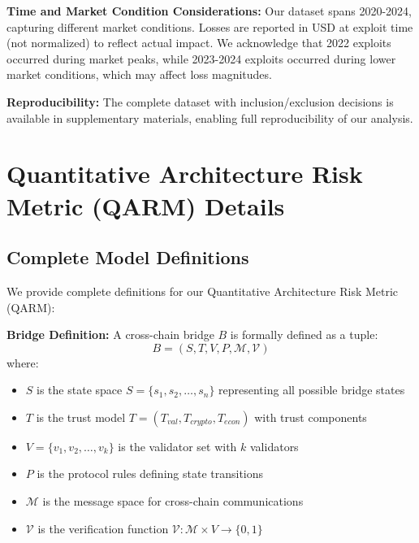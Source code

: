 \documentclass[runningheads]{llncs}
\begin{document}
\textbf{Time and Market Condition Considerations:} Our dataset spans 2020-2024, capturing different market conditions. Losses are reported in USD at exploit time (not normalized) to reflect actual impact. We acknowledge that 2022 exploits occurred during market peaks, while 2023-2024 exploits occurred during lower market conditions, which may affect loss magnitudes.

\textbf{Reproducibility:} The complete dataset with inclusion/exclusion decisions is available in supplementary materials, enabling full reproducibility of our analysis.

\section{Quantitative Architecture Risk Metric (QARM) Details}
\label{app:formal_model}

\subsection{Complete Model Definitions}
We provide complete definitions for our Quantitative Architecture Risk Metric (QARM):

\textbf{Bridge Definition:} A cross-chain bridge $B$ is formally defined as a tuple:
\begin{equation}
B = (S, T, V, P, \mathcal{M}, \mathcal{V})
\end{equation}
where:
\begin{itemize}
    \item $S$ is the state space $S = \{s_1, s_2, \ldots, s_n\}$ representing all possible bridge states
    \item $T$ is the trust model $T = (T_{val}, T_{crypto}, T_{econ})$ with trust components
    \item $V = \{v_1, v_2, \ldots, v_k\}$ is the validator set with $k$ validators
    \item $P$ is the protocol rules defining state transitions
    \item $\mathcal{M}$ is the message space for cross-chain communications
    \item $\mathcal{V}$ is the verification function $\mathcal{V}: \mathcal{M} \times V \rightarrow \{0,1\}$
\end{itemize}
\end{document}
